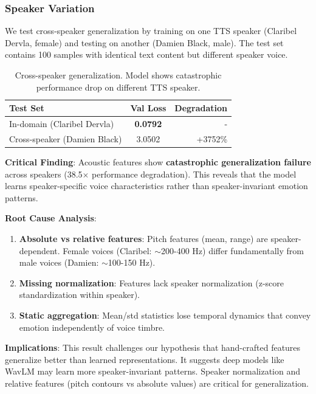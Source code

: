 \subsubsection{Speaker Variation}

We test cross-speaker generalization by training on one TTS speaker (Claribel Dervla, female) and testing on another (Damien Black, male). The test set contains 100 samples with identical text content but different speaker voice.

\begin{table}[t]
\centering
\small
\begin{tabular}{lcr}
\toprule
\textbf{Test Set} & \textbf{Val Loss} & \textbf{Degradation} \\
\midrule
In-domain (Claribel Dervla) & \textbf{0.0792} & - \\
Cross-speaker (Damien Black) & 3.0502 & +3752\% \\
\bottomrule
\end{tabular}
\caption{Cross-speaker generalization. Model shows catastrophic performance drop on different TTS speaker.}
\label{tab:cross_speaker}
\end{table}

\textbf{Critical Finding}: Acoustic features show \textbf{catastrophic generalization failure} across speakers (38.5$\times$ performance degradation). This reveals that the model learns speaker-specific voice characteristics rather than speaker-invariant emotion patterns.

\textbf{Root Cause Analysis}:
\begin{enumerate}
    \item \textbf{Absolute vs relative features}: Pitch features (mean, range) are speaker-dependent. Female voices (Claribel: $\sim$200-400 Hz) differ fundamentally from male voices (Damien: $\sim$100-150 Hz).
    \item \textbf{Missing normalization}: Features lack speaker normalization (z-score standardization within speaker).
    \item \textbf{Static aggregation}: Mean/std statistics lose temporal dynamics that convey emotion independently of voice timbre.
\end{enumerate}

\textbf{Implications}: This result challenges our hypothesis that hand-crafted features generalize better than learned representations. It suggests deep models like WavLM may learn more speaker-invariant patterns. Speaker normalization and relative features (pitch contours vs absolute values) are critical for generalization.

